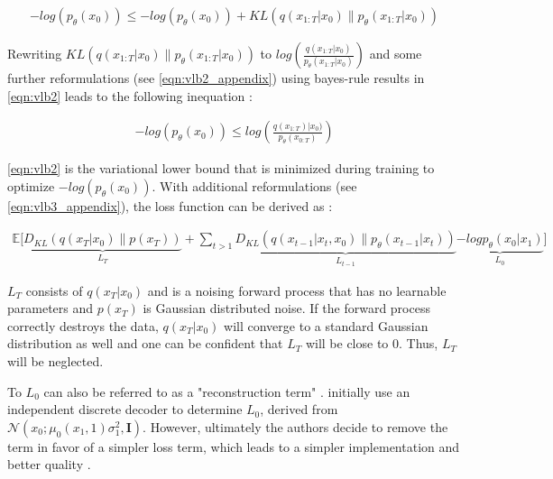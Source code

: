 \begin{equation}
  \label{eqn:vlb_b}
  \begin{align*}
    -log(p_\theta(x_0)) \leq -log(p_\theta(x_0)) + KL(q(x_{1:T}|x_0) \parallel p_\theta(x_{1:T}|x_0))
  \end{align*}
\end{equation}

\noindent Rewriting $KL(q(x_{1:T}|x_0) \parallel p_\theta(x_{1:T}|x_0))$ to $log(\frac{q(x_{1:T}|x_0)}{p_\theta(x_{1:T}|x_0)})$ and some further reformulations (see \autoref{eqn:vlb2_appendix}) using bayes-rule results in \autoref{eqn:vlb2} leads to the following inequation \cite{ho2020DenoisingDiffusionProbabilistic}:

\begin{equation}
  \label{eqn:vlb2}
  \begin{align*}
    -log(p_\theta(x_0)) \leq log(\frac{q(x_{1:T})|x_0)}{p_\theta(x_{0:T})})
  \end{align*}
\end{equation}

\noindent \autoref{eqn:vlb2} is the variational lower bound that is minimized during training to optimize $-log(p_\theta(x_0))$.
With additional reformulations (see \autoref{eqn:vlb3_appendix}), the loss function can be derived as \cite{ho2020DenoisingDiffusionProbabilistic}:

\begin{equation}
  \label{eqn:vlb3}
  \begin{align*}
   \mathbb{E}\biggl[\underbrace{D_{KL}(q(x_{T}|x_0) \parallel p(x_T))}_{L_T} + \sum_{t>1}^{} \underbrace{  D_{KL}(q(x_{t-1}|x_t,x_0) \parallel p_\theta(x_{t-1}|x_t)) }_{L_{t-1}}  \underbrace{ -log p_\theta(x_0|x_1) }_{L_{0}}\biggr]
  \end{align*}
\end{equation}

$L_T$ consists of $q(x_{T}|x_0)$ and is a noising forward process that has no learnable parameters and $p(x_T)$ is Gaussian distributed noise.
If the forward process correctly destroys the data, $q(x_{T}|x_0)$ will converge to a standard Gaussian distribution as well and one can be confident that $L_T$ will be close to $0$.
Thus, $L_T$ will be neglected.

To $L_{0}$ can also be referred to as a "reconstruction term" \cite[p. 10]{luo2022UnderstandingDiffusionModels}.
\textcite{ho2020DenoisingDiffusionProbabilistic} initially use an independent discrete decoder to determine $L_{0}$, derived from $\mathcal{N}(x_0;\mu_0(x_1,1)\sigma^2_1,\textbf{I})$.
However, ultimately the authors decide to remove the term in favor of a simpler loss term, which leads to a simpler implementation and better quality \cite{ho2020DenoisingDiffusionProbabilistic}.

